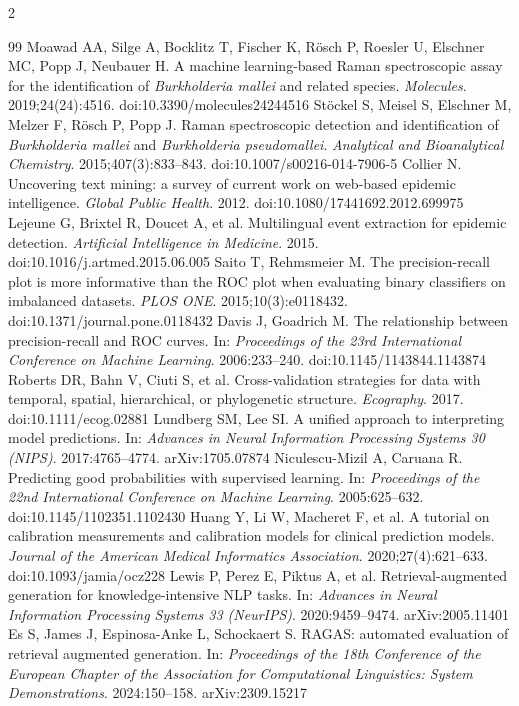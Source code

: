 \documentclass[10pt,openany]{report}
\begin{document}
\begin{multicols}{2}
\begin{thebibliography}{99}
 Moawad AA, Silge A, Bocklitz T, Fischer K, R\"osch P, Roesler U, Elschner MC, Popp J, Neubauer H. A machine learning-based Raman spectroscopic assay for the identification of \emph{Burkholderia mallei} and related species. \emph{Molecules}. 2019;24(24):4516. doi:10.3390/molecules24244516
 St\"ockel S, Meisel S, Elschner M, Melzer F, R\"osch P, Popp J. Raman spectroscopic detection and identification of \emph{Burkholderia mallei} and \emph{Burkholderia pseudomallei}. \emph{Analytical and Bioanalytical Chemistry}. 2015;407(3):833--843. doi:10.1007/s00216-014-7906-5
 Collier N. Uncovering text mining: a survey of current work on web-based epidemic intelligence. \emph{Global Public Health}. 2012. doi:10.1080/17441692.2012.699975
 Lejeune G, Brixtel R, Doucet A, et al. Multilingual event extraction for epidemic detection. \emph{Artificial Intelligence in Medicine}. 2015. doi:10.1016/j.artmed.2015.06.005
 Saito T, Rehmsmeier M. The precision-recall plot is more informative than the ROC plot when evaluating binary classifiers on imbalanced datasets. \emph{PLOS ONE}. 2015;10(3):e0118432. doi:10.1371/journal.pone.0118432
 Davis J, Goadrich M. The relationship between precision-recall and ROC curves. In: \emph{Proceedings of the 23rd International Conference on Machine Learning}. 2006:233--240. doi:10.1145/1143844.1143874
 Roberts DR, Bahn V, Ciuti S, et al. Cross-validation strategies for data with temporal, spatial, hierarchical, or phylogenetic structure. \emph{Ecography}. 2017. doi:10.1111/ecog.02881
 Lundberg SM, Lee SI. A unified approach to interpreting model predictions. In: \emph{Advances in Neural Information Processing Systems 30 (NIPS)}. 2017:4765--4774. arXiv:1705.07874
 Niculescu-Mizil A, Caruana R. Predicting good probabilities with supervised learning. In: \emph{Proceedings of the 22nd International Conference on Machine Learning}. 2005:625--632. doi:10.1145/1102351.1102430
 Huang Y, Li W, Macheret F, et al. A tutorial on calibration measurements and calibration models for clinical prediction models. \emph{Journal of the American Medical Informatics Association}. 2020;27(4):621--633. doi:10.1093/jamia/ocz228
 Lewis P, Perez E, Piktus A, et al. Retrieval-augmented generation for knowledge-intensive NLP tasks. In: \emph{Advances in Neural Information Processing Systems 33 (NeurIPS)}. 2020:9459--9474. arXiv:2005.11401
 Es S, James J, Espinosa-Anke L, Schockaert S. RAGAS: automated evaluation of retrieval augmented generation. In: \emph{Proceedings of the 18th Conference of the European Chapter of the Association for Computational Linguistics: System Demonstrations}. 2024:150--158. arXiv:2309.15217

\end{thebibliography}
\end{multicols}
\end{document}
